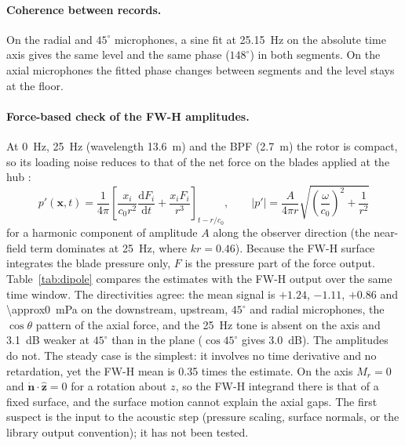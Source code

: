 \documentclass[11pt]{article}
\begin{document}
\paragraph{Coherence between records.} On the radial and $45^\circ$ microphones, a sine fit at \SI{25.15}{Hz} on the
absolute time axis gives the same level and the same phase ($148^\circ$) in both segments. On the axial microphones
the fitted phase changes between segments and the level stays at the floor.

\paragraph{Force-based check of the FW-H amplitudes.} At \SI{0}{Hz}, \SI{25}{Hz} (wavelength \SI{13.6}{m}) and the
BPF (\SI{2.7}{m}) the rotor is compact, so its loading noise reduces to that of the net force on the blades applied at
the hub \citep{lowson1965}:
\begin{equation}
  p'(\mathbf{x},t)=\frac{1}{4\pi}\left[\frac{x_i}{c_0r^2}\frac{\mathrm{d}F_i}{\mathrm{d}t}+\frac{x_iF_i}{r^3}\right]_{t-r/c_0},
  \qquad |p'|=\frac{A}{4\pi r}\sqrt{\left(\frac{\omega}{c_0}\right)^2+\frac{1}{r^2}}
  \label{eq:dipole}
\end{equation}
for a harmonic component of amplitude $A$ along the observer direction (the near-field term dominates at \SI{25}{Hz},
where $kr=0.46$). Because the FW-H surface integrates the blade pressure only, $F$ is the pressure part of the force
output. Table~\ref{tab:dipole} compares the estimates with the FW-H output over the same time window. The
directivities agree: the mean signal is $+1.24$, $-1.11$, $+0.86$ and \SI{\approx0}{mPa} on the downstream, upstream,
$45^\circ$ and radial microphones, the $\cos\theta$ pattern of the axial force, and the \SI{25}{Hz} tone is absent on
the axis and \SI{3.1}{dB} weaker at $45^\circ$ than in the plane ($\cos 45^\circ$ gives \SI{3.0}{dB}). The amplitudes do
not. The steady case is the simplest: it involves no time derivative and no retardation, yet the FW-H mean is 0.35
times the estimate. On the axis $M_r=0$ and $\dot{\mathbf{n}}\cdot\hat{\mathbf{z}}=0$ for a rotation about $z$, so
the FW-H integrand there is that of a fixed surface, and the surface motion cannot explain the axial gaps. The first
suspect is the input to the acoustic step (pressure scaling, surface normals, or the library output convention); it
has not been tested.

\begin{table}[h]
\centering
\caption{FW-H output against the compact-dipole estimate (\ref{eq:dipole}) from the blade pressure force
($r=\SI{1}{m}$; script \texttt{paper/scripts/dipole\_check.py}).}
\label{tab:dipole}
\small

\end{table}
\end{document}
